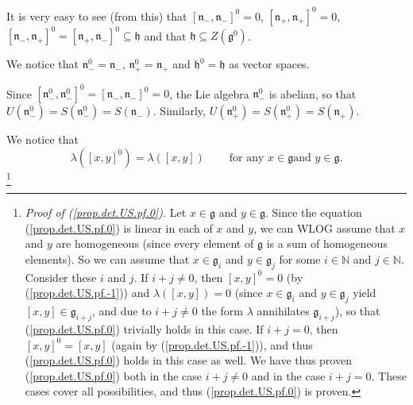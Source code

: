 \documentclass[etingof-lie.tex]{subfiles}
\begin{document}
It is very easy to see (from this) that $\left[  \mathfrak{n}_{-}%
,\mathfrak{n}_{-}\right]  ^{0}=0$, $\left[  \mathfrak{n}_{+},\mathfrak{n}%
_{+}\right]  ^{0}=0$, $\left[  \mathfrak{n}_{-},\mathfrak{n}_{+}\right]
^{0}=\left[  \mathfrak{n}_{+},\mathfrak{n}_{-}\right]  ^{0}\subseteq
\mathfrak{h}$ and that $\mathfrak{h}\subseteq Z\left(  \mathfrak{g}%
^{0}\right)  $.

We notice that $\mathfrak{n}_{-}^{0}=\mathfrak{n}_{-}$, $\mathfrak{n}_{+}%
^{0}=\mathfrak{n}_{+}$ and $\mathfrak{h}^{0}=\mathfrak{h}$ as vector spaces.

Since $\left[  \mathfrak{n}_{-}^{0},\mathfrak{n}_{-}^{0}\right]  ^{0}=\left[
\mathfrak{n}_{-},\mathfrak{n}_{-}\right]  ^{0}=0$, the Lie algebra
$\mathfrak{n}_{-}^{0}$ is abelian, so that $U\left(  \mathfrak{n}_{-}%
^{0}\right)  =S\left(  \mathfrak{n}_{-}^{0}\right)  =S\left(  \mathfrak{n}%
_{-}\right)  $. Similarly, $U\left(  \mathfrak{n}_{+}^{0}\right)  =S\left(
\mathfrak{n}_{+}^{0}\right)  =S\left(  \mathfrak{n}_{+}\right)  $.

We notice that%
\begin{equation}
\lambda\left(  \left[  x,y\right]  ^{0}\right)  =\lambda\left(  \left[
x,y\right]  \right)  \ \ \ \ \ \ \ \ \ \ \text{for any }x\in\mathfrak{g}\text{
and }y\in\mathfrak{g}. \label{prop.det.US.pf.0}%
\end{equation}
\footnote{\textit{Proof of (\ref{prop.det.US.pf.0}).} Let $x\in\mathfrak{g}$
and $y\in\mathfrak{g}$. Since the equation (\ref{prop.det.US.pf.0}) is linear
in each of $x$ and $y$, we can WLOG assume that $x$ and $y$ are homogeneous
(since every element of $\mathfrak{g}$ is a sum of homogeneous elements). So
we can assume that $x\in\mathfrak{g}_{i}$ and $y\in\mathfrak{g}_{j}$ for some
$i\in\mathbb{N}$ and $j\in\mathbb{N}$. Consider these $i$ and $j$. If
$i+j\neq0$, then $\left[  x,y\right]  ^{0}=0$ (by (\ref{prop.det.US.pf.-1}))
and $\lambda\left(  \left[  x,y\right]  \right)  =0$ (since $x\in
\mathfrak{g}_{i}$ and $y\in\mathfrak{g}_{j}$ yield $\left[  x,y\right]
\in\mathfrak{g}_{i+j}$, and due to $i+j\neq0$ the form $\lambda$ annihilates
$\mathfrak{g}_{i+j}$), so that (\ref{prop.det.US.pf.0}) trivially holds in
this case. If $i+j=0$, then $\left[  x,y\right]  ^{0}=\left[  x,y\right]  $
(again by (\ref{prop.det.US.pf.-1})), and thus (\ref{prop.det.US.pf.0}) holds
in this case as well. We have thus proven (\ref{prop.det.US.pf.0}) both in the
case $i+j\neq0$ and in the case $i+j=0$. These cases cover all possibilities,
and thus (\ref{prop.det.US.pf.0}) is proven.}
\end{document}

